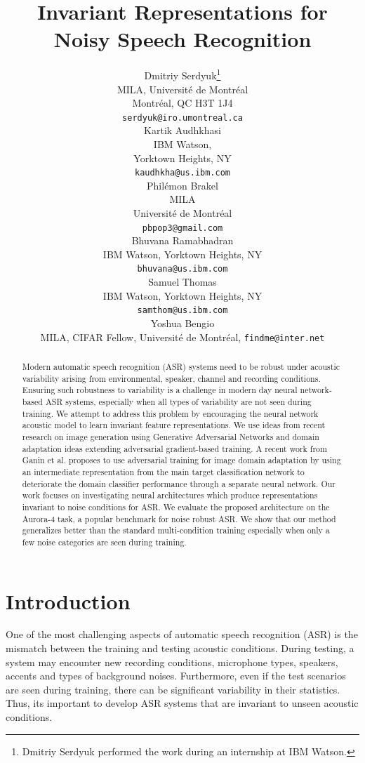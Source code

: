 \documentclass{article}
\title{Invariant Representations for Noisy Speech Recognition}
\author{
  Dmitriy Serdyuk\thanks{Dmitriy Serdyuk performed the work 
    during an internship at IBM Watson.} \\
  MILA,
  Universit\'e de Montr\'eal\\
  Montr\'eal, QC H3T 1J4 \\
  \texttt{serdyuk@iro.umontreal.ca} \\
  \And
  Kartik Audhkhasi \\
  IBM Watson, \\
  Yorktown Heights, NY \\
  \texttt{kaudhkha@us.ibm.com} \\
  \And
  Phil\'emon Brakel \\
  MILA\\
  Universit\'e de Montr\'eal\\
  \texttt{pbpop3@gmail.com} \\
  \And
  Bhuvana Ramabhadran\\
  IBM Watson,
  Yorktown Heights, NY \\
  \texttt{bhuvana@us.ibm.com} \\
  \And
  Samuel Thomas\\
  IBM Watson,
  Yorktown Heights, NY \\
  \texttt{samthom@us.ibm.com} \\
  \And
  Yoshua Bengio\\
  MILA, CIFAR Fellow,
  Universit\'e de Montr\'eal,
  \texttt{findme@inter.net} \\
}
\begin{document}
%
\maketitle
%
\begin{abstract}
    Modern automatic speech recognition (ASR) systems need to be robust under acoustic variability arising from environmental, speaker, channel and recording conditions. Ensuring such robustness to variability is a challenge in modern day neural network-based ASR systems, especially when all types of variability are not seen during training. We attempt to address this problem by encouraging the neural network acoustic model to learn invariant feature representations.
    We use ideas from recent research on image generation using
    Generative Adversarial Networks and domain adaptation ideas extending
    adversarial gradient-based training. A recent work from Ganin et al. proposes to
    use adversarial training for image domain adaptation by using an intermediate
    representation from the main target classification network to deteriorate the domain 
    classifier performance through a separate neural network.
    Our work focuses on investigating neural architectures which produce
    representations invariant to noise conditions for ASR.  We evaluate the proposed architecture on the Aurora-4 task, a popular benchmark for
    noise robust ASR. We show that our method generalizes better than the standard multi-condition training especially when only a few noise categories are seen during training.
\end{abstract}
%
%
\section{Introduction}
\label{sec:intro}
    One of the most challenging aspects of automatic speech recognition (ASR)
    is the mismatch between the training and testing acoustic conditions. During
    testing, a system may encounter new recording conditions, microphone types, speakers,
    accents and types of background noises. Furthermore, even if the test scenarios are seen during training, there can be significant variability in their statistics. Thus, its important to develop ASR systems that are invariant to unseen acoustic conditions.
\end{document}
